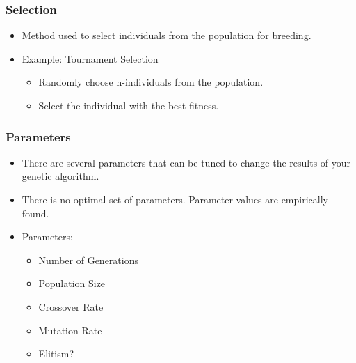 \documentclass{beamer}
\begin{document}
\begin{frame}

	\frametitle{Selection}

	\begin{itemize}
		\item Method used to select individuals from the population for breeding.
		\item Example: Tournament Selection
		\begin{itemize}
			\item Randomly choose n-individuals from the population.
			\item Select the individual with the best fitness.
		\end{itemize}
	\end{itemize}

\end{frame}

\begin{frame}

	\frametitle{Parameters}

	\begin{itemize}
		\item There are several parameters that can be tuned to change the results of your genetic algorithm.
		\item There is no optimal set of parameters. Parameter values are empirically found.
		\item Parameters:
			\begin{itemize}
				\item Number of Generations
				\item Population Size
				\item Crossover Rate
				\item Mutation Rate
				\item Elitism?
			\end{itemize}
	\end{itemize}

\end{frame}

\end{document}
